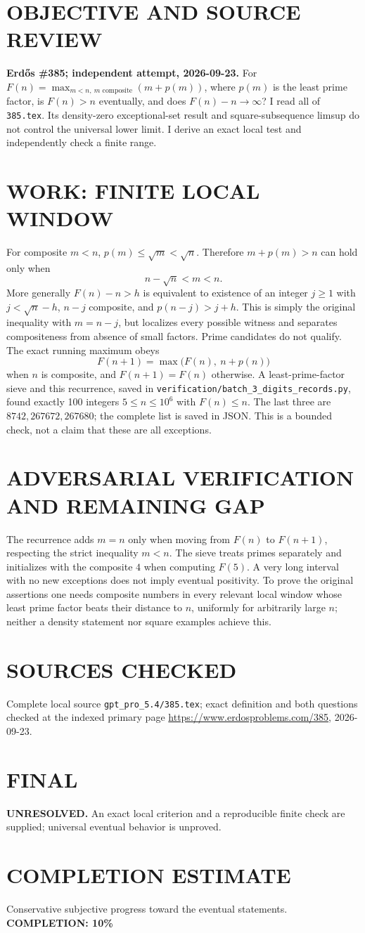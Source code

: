 \section{OBJECTIVE AND SOURCE REVIEW}
\textbf{Erd\H{o}s \#385; independent attempt, 2026-09-23.}
For $F(n)=\max_{m<n,\ m\text{ composite}}(m+p(m))$, where $p(m)$ is the least prime factor, is $F(n)>n$ eventually, and does $F(n)-n\to\infty$? I read all of \texttt{385.tex}. Its density-zero exceptional-set result and square-subsequence limsup do not control the universal lower limit. I derive an exact local test and independently check a finite range.
\section{WORK: FINITE LOCAL WINDOW}
For composite $m<n$, $p(m)\le\sqrt m<\sqrt n$. Therefore $m+p(m)>n$ can hold only when
\[
n-\sqrt n<m<n.
\]
More generally $F(n)-n>h$ is equivalent to existence of an integer $j\ge1$ with $j<\sqrt n-h$, $n-j$ composite, and $p(n-j)>j+h$. This is simply the original inequality with $m=n-j$, but localizes every possible witness and separates compositeness from absence of small factors. Prime candidates do not qualify.
The exact running maximum obeys
\[
F(n+1)=\max\bigl(F(n),\ n+p(n)\bigr)
\]
when $n$ is composite, and $F(n+1)=F(n)$ otherwise. A least-prime-factor sieve and this recurrence, saved in \texttt{verification/batch\_3\_digits\_records.py}, found exactly 100 integers $5\le n\le10^6$ with $F(n)\le n$. The last three are $8742,267672,267680$; the complete list is saved in JSON. This is a bounded check, not a claim that these are all exceptions.
\section{ADVERSARIAL VERIFICATION AND REMAINING GAP}
The recurrence adds $m=n$ only when moving from $F(n)$ to $F(n+1)$, respecting the strict inequality $m<n$. The sieve treats primes separately and initializes with the composite $4$ when computing $F(5)$. A very long interval with no new exceptions does not imply eventual positivity. To prove the original assertions one needs composite numbers in every relevant local window whose least prime factor beats their distance to $n$, uniformly for arbitrarily large $n$; neither a density statement nor square examples achieve this.
\section{SOURCES CHECKED}
Complete local source \texttt{gpt\_pro\_5.4/385.tex}; exact definition and both questions checked at the indexed primary page \url{https://www.erdosproblems.com/385}, 2026-09-23.
\section{FINAL}
\textbf{UNRESOLVED.} An exact local criterion and a reproducible finite check are supplied; universal eventual behavior is unproved.
\section{COMPLETION ESTIMATE}
Conservative subjective progress toward the eventual statements.
\textbf{COMPLETION: 10\%}
